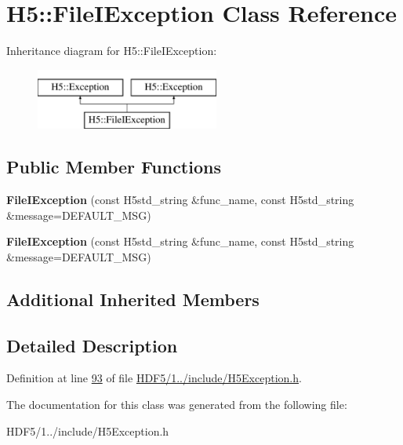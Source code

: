 \hypertarget{class_h5_1_1_file_i_exception}{}\section{H5\+:\+:File\+I\+Exception Class Reference}
\label{class_h5_1_1_file_i_exception}
Inheritance diagram for H5\+:\+:File\+I\+Exception\+:\begin{figure}[H]
\begin{center}
\leavevmode
\includegraphics[height=2.000000cm]{class_h5_1_1_file_i_exception}
\end{center}
\end{figure}
\subsection*{Public Member Functions}
\begin{DoxyCompactItemize}
\item 
\mbox{\label{class_h5_1_1_file_i_exception_aeb21e54f8421a542227dfb0becf6b643}} 
{\bfseries File\+I\+Exception} (const H5std\+\_\+string \&func\+\_\+name, const H5std\+\_\+string \&message=D\+E\+F\+A\+U\+L\+T\+\_\+\+M\+SG)
\item 
\mbox{\label{class_h5_1_1_file_i_exception_aeb21e54f8421a542227dfb0becf6b643}} 
{\bfseries File\+I\+Exception} (const H5std\+\_\+string \&func\+\_\+name, const H5std\+\_\+string \&message=D\+E\+F\+A\+U\+L\+T\+\_\+\+M\+SG)
\end{DoxyCompactItemize}
\subsection*{Additional Inherited Members}


\subsection{Detailed Description}


Definition at line \hyperlink{_h_d_f5_21_810_81_2include_2_h5_exception_8h_source_l00093}{93} of file \hyperlink{_h_d_f5_21_810_81_2include_2_h5_exception_8h_source}{H\+D\+F5/1../include/\+H5\+Exception.\+h}.



The documentation for this class was generated from the following file\+:\begin{DoxyCompactItemize}
\item 
H\+D\+F5/1../include/\+H5\+Exception.\+h\end{DoxyCompactItemize}
